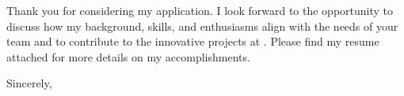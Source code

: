 \hspace{1.5em} Thank you for considering my application. I look forward to the opportunity to discuss how my background, skills, and enthusiasms align with the needs of your team and to contribute to the innovative projects at \company. Please find my resume attached for more details on my accomplishments.
\vspace{1.0em}

Sincerely,\\
\myName\\[1.0em]
\href{\myEmailHref}{%
}\\[0.1em]
\href{\myGitHubHref}{%
}\\[0.1em]
\href{\myLinkedInHref}{%
}\\[0.1em]
